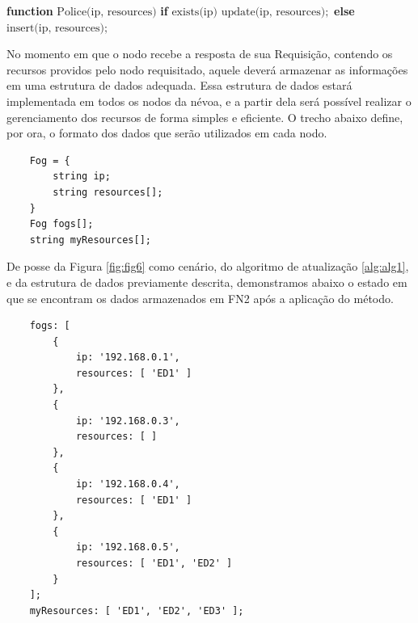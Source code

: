 \begin{algorithm}[htb]
    \begin{center}
        \begin{algorithmic}[1]
            \STATE \textbf{function} $\text{Police(ip, resources)}$
            \STATE \hspace{\algorithmicindent} \textbf{if} $\text{exists(ip)}$
            \STATE \hspace{\algorithmicindent} \hspace{\algorithmicindent} $\text{update(ip, resources)};$
            \STATE \hspace{\algorithmicindent} \textbf{else}
            \STATE \hspace{\algorithmicindent} \hspace{\algorithmicindent} $\text{insert(ip, resources)};$
        \end{algorithmic}
    \end{center}
    \caption[Política de atualização de recursos]%
        {\label{alg:alg1} Política de atualização de recursos.}%
    \end{algorithm}

No momento em que o nodo recebe a resposta de sua Requisição, contendo os recursos providos pelo nodo requisitado, aquele deverá armazenar as informações em uma estrutura de dados adequada.
Essa estrutura de dados estará implementada em todos os nodos da névoa, e a partir dela será possível realizar o gerenciamento dos recursos de forma simples e eficiente.
O trecho abaixo define, por ora, o formato dos dados que serão utilizados em cada nodo.




\begin{verbatim}
    Fog = {
        string ip;
        string resources[];    
    }
    Fog fogs[];
    string myResources[];
\end{verbatim}

De posse da Figura \ref{fig:fig6} como cenário, do algoritmo de atualização \ref{alg:alg1}, e da estrutura de dados previamente descrita,
demonstramos abaixo o estado em que se encontram os dados armazenados em FN2 após a aplicação do método.

\begin{verbatim}
    fogs: [
        {
            ip: '192.168.0.1',
            resources: [ 'ED1' ]
        },
        {
            ip: '192.168.0.3',
            resources: [ ]
        },
        {
            ip: '192.168.0.4',
            resources: [ 'ED1' ]
        },
        {
            ip: '192.168.0.5',
            resources: [ 'ED1', 'ED2' ]
        }
    ];
    myResources: [ 'ED1', 'ED2', 'ED3' ];
\end{verbatim}

